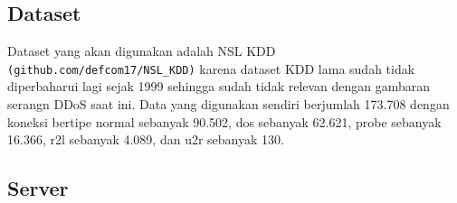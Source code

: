 \subsection{Dataset}

Dataset yang akan digunakan adalah NSL KDD \texttt{(github.com/defcom17/NSL\_KDD)} karena dataset KDD lama sudah tidak diperbaharui lagi sejak 1999 sehingga sudah tidak relevan dengan gambaran serangn DDoS saat ini.
Data yang digunakan sendiri berjumlah 173.708 dengan koneksi bertipe normal sebanyak 90.502, dos sebanyak 62.621, probe sebanyak 16.366, r2l sebanyak 4.089, dan u2r sebanyak 130.

\subsection{Server}
